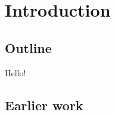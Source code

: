 \chapter{Introduction}
\label{chap:introduction}



\section{Outline}

Hello!

\section{Earlier work}
